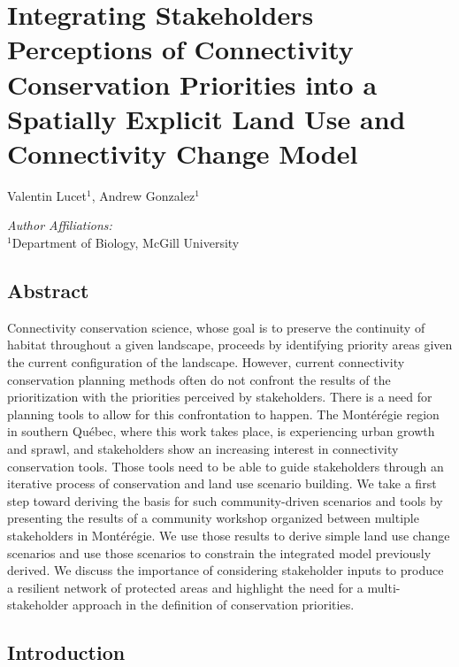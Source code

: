 \chapter{Integrating Stakeholders Perceptions of Connectivity Conservation Priorities into a Spatially Explicit Land Use and Connectivity Change Model}
\begin{center}
{Valentin Lucet$^{1}$, Andrew Gonzalez$^{1}$}\\
\end{center}
\textit{Author Affiliations:}\\
\normalsize{$^{1}$Department of Biology, McGill University}\\

\newrefsection

\section{Abstract}

Connectivity conservation science, whose goal is to preserve the continuity of habitat throughout a given landscape, proceeds by identifying priority areas given the current configuration of the landscape. However, current connectivity conservation planning methods often do not confront the results of the prioritization with the priorities perceived by stakeholders. There is a need for planning tools to allow for this confrontation to happen. The Montérégie region in southern Québec, where this work takes place, is experiencing urban growth and sprawl, and stakeholders show an increasing interest in connectivity conservation tools. Those tools need to be able to guide stakeholders through an iterative process of conservation and land use scenario building. We take a first step toward deriving the basis for such community-driven scenarios and tools by presenting the results of a community workshop organized between multiple stakeholders in Montérégie. We use those results to derive simple land use change scenarios and use those scenarios to constrain the integrated model previously derived. We discuss the importance of considering stakeholder inputs to produce a resilient network of protected areas and highlight the need for a multi-stakeholder approach in the definition of conservation priorities. \\

\newpage

\section{Introduction}

